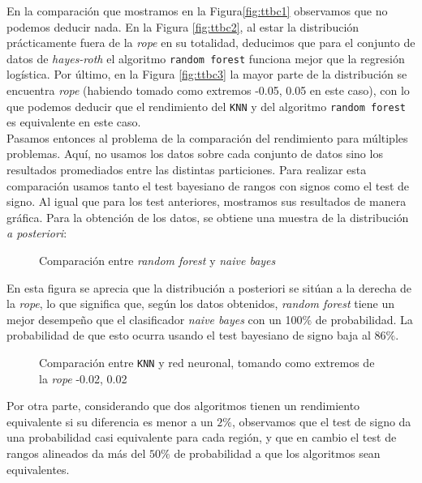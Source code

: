 En la comparación que mostramos en la Figura\ref{fig:ttbc1} 
observamos que no podemos deducir nada. En la Figura \ref{fig:ttbc2}, 
al estar la distribución prácticamente fuera de la
 \textit{rope} en su totalidad, deducimos que para el 
 conjunto de datos de \textit{hayes-roth} el algoritmo
 \texttt{random forest} funciona mejor que la regresión 
 logística. Por último, en la Figura \ref{fig:ttbc3} la
 mayor parte de la distribución se encuentra \textit{rope}
 (habiendo tomado como extremos -0.05, 0.05 en este caso),
 con lo que podemos deducir que el rendimiento del \texttt{KNN} y del algoritmo \texttt{random forest} es 
 equivalente en este caso.\\
 
 Pasamos entonces al problema de la comparación del
rendimiento para múltiples problemas. Aquí, no usamos los
datos sobre cada conjunto de datos sino los resultados 
promediados entre las distintas particiones. Para realizar
esta comparación usamos tanto el test bayesiano de rangos
con signos como el test de signo. Al igual que para los 
test anteriores, mostramos sus resultados de manera gráfica.
Para la obtención de los datos, se obtiene una muestra de la distribución \textit{a posteriori}:

\begin{figure}[H]
\centering
{}
\caption{Comparación entre \textit{random forest} y \textit{naive bayes}}
\end{figure}

	En esta figura se aprecia que la distribución a posteriori se sitúan a la derecha de la \textit{rope}, lo que significa que, según los datos obtenidos, \textit{random forest} tiene un mejor desempeño que el clasificador \textit{naive bayes} con un 100$\%$ de probabilidad. La probabilidad de que esto ocurra usando el test bayesiano de signo baja al $86\%$.

\begin{figure}[H]
\centering
{}
\caption{Comparación entre \texttt{KNN} y red neuronal, tomando como extremos de la \textit{rope} -0.02, 0.02}
\end{figure}

	Por otra parte, considerando que dos algoritmos tienen un 
rendimiento equivalente si su diferencia es menor a un $2\%$, 
observamos que el test de signo da una probabilidad casi equivalente para cada región, y que en cambio el test de rangos alineados da más del $50\%$ de probabilidad a que los algoritmos sean equivalentes.



